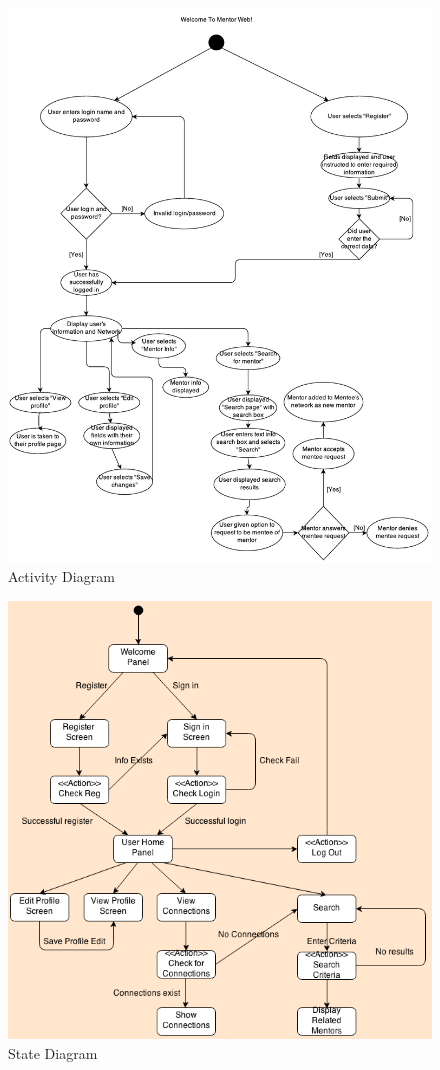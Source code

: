 \documentclass[11pt]{article}
\begin{document}
			\begin{figure}[H]
				\centering
				\includegraphics[width=12 cm]{Activity_Diagram}
				\caption{Activity Diagram}
				\label{ActivityD}
			\end{figure}

			\begin{figure}[H]
				\centering
				\includegraphics[width=12 cm]{State_Diagram}
				\caption{State Diagram}
				\label{StateD}
			\end{figure}
\end{document}
